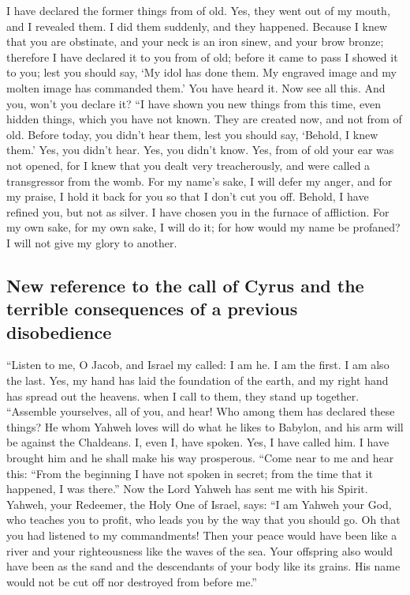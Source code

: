  I have declared the former things from of old. Yes, they
went out of my mouth, and I revealed them. I did them suddenly, and they
happened.  Because I knew that you are obstinate, and your
neck is an iron sinew, and your brow bronze;  therefore I
have declared it to you from of old; before it came to pass I showed it
to you; lest you should say, `My idol has done them. My engraved image
and my molten image has commanded them.'  You have heard
it. Now see all this. And you, won't you declare it? ``I have shown you
new things from this time, even hidden things, which you have not known.
 They are created now, and not from of old. Before today,
you didn't hear them, lest you should say, `Behold, I knew them.'
 Yes, you didn't hear. Yes, you didn't know. Yes, from of
old your ear was not opened, for I knew that you dealt very
treacherously, and were called a transgressor from the womb.
 For my name's sake, I will defer my anger, and for my
praise, I hold it back for you so that I don't cut you off.
 Behold, I have refined you, but not as silver. I have
chosen you in the furnace of affliction.  For my own
sake, for my own sake, I will do it; for how would my name be profaned?
I will not give my glory to another.

\hypertarget{new-reference-to-the-call-of-cyrus-and-the-terrible-consequences-of-a-previous-disobedience}{%
\subsection{New reference to the call of Cyrus and the terrible
consequences of a previous
disobedience}\label{new-reference-to-the-call-of-cyrus-and-the-terrible-consequences-of-a-previous-disobedience}}

 ``Listen to me, O Jacob, and Israel my called: I am he.
I am the first. I am also the last.  Yes, my hand has
laid the foundation of the earth, and my right hand has spread out the
heavens. when I call to them, they stand up together. 
``Assemble yourselves, all of you, and hear! Who among them has declared
these things? He whom Yahweh loves will do what he likes to Babylon, and
his arm will be against the Chaldeans.  I, even I, have
spoken. Yes, I have called him. I have brought him and he shall make his
way prosperous.  ``Come near to me and hear this: ``From
the beginning I have not spoken in secret; from the time that it
happened, I was there.'' Now the Lord Yahweh has sent me with his
Spirit.  Yahweh, your Redeemer, the Holy One of Israel,
says: ``I am Yahweh your God, who teaches you to profit, who leads you
by the way that you should go.  Oh that you had listened
to my commandments! Then your peace would have been like a river and
your righteousness like the waves of the sea.  Your
offspring also would have been as the sand and the descendants of your
body like its grains. His name would not be cut off nor destroyed from
before me.''

